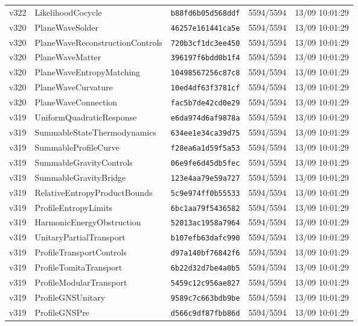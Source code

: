 \documentclass[11pt]{article}
\theoremstyle{definition}\newtheorem{deriv}{Derivation}
\begin{document}
{\begin{longtable}{@{}lllll@{}}
v322 & LikelihoodCocycle & \texttt{b88fd6b05d568ddf} & 5594/5594 & 13/09 10:01:29 \\
v320 & PlaneWaveSolder & \texttt{46257e161441ca5e} & 5594/5594 & 13/09 10:01:29 \\
v320 & PlaneWaveReconstructionControls & \texttt{720b3cf1dc3ee450} & 5594/5594 & 13/09 10:01:29 \\
v320 & PlaneWaveMatter & \texttt{396197f6bdd0b1f4} & 5594/5594 & 13/09 10:01:29 \\
v320 & PlaneWaveEntropyMatching & \texttt{10498567256c87c8} & 5594/5594 & 13/09 10:01:29 \\
v320 & PlaneWaveCurvature & \texttt{10ed4df63f3781cf} & 5594/5594 & 13/09 10:01:29 \\
v320 & PlaneWaveConnection & \texttt{fac5b7de42cd0e29} & 5594/5594 & 13/09 10:01:29 \\
v319 & UniformQuadraticResponse & \texttt{e6da974d6af9878a} & 5594/5594 & 13/09 10:01:29 \\
v319 & SummableStateThermodynamics & \texttt{634ee1e34ca39d75} & 5594/5594 & 13/09 10:01:29 \\
v319 & SummableProfileCurve & \texttt{f28ea6a1d59f5a53} & 5594/5594 & 13/09 10:01:29 \\
v319 & SummableGravityControls & \texttt{06e9fe6d45db5fec} & 5594/5594 & 13/09 10:01:29 \\
v319 & SummableGravityBridge & \texttt{123e4aa79e59a727} & 5594/5594 & 13/09 10:01:29 \\
v319 & RelativeEntropyProductBounds & \texttt{5c9e974ff0b55533} & 5594/5594 & 13/09 10:01:29 \\
v319 & ProfileEntropyLimits & \texttt{6bc1aa79f5436582} & 5594/5594 & 13/09 10:01:29 \\
v319 & HarmonicEnergyObstruction & \texttt{52013ac1958a7964} & 5594/5594 & 13/09 10:01:29 \\
v319 & UnitaryPartialTransport & \texttt{b107efb63dafc990} & 5594/5594 & 13/09 10:01:29 \\
v319 & ProfileTransportControls & \texttt{d97a140bf76842f6} & 5594/5594 & 13/09 10:01:29 \\
v319 & ProfileTomitaTransport & \texttt{6b22d32d7be4a0b5} & 5594/5594 & 13/09 10:01:29 \\
v319 & ProfileModularTransport & \texttt{5459c12c956ae827} & 5594/5594 & 13/09 10:01:29 \\
v319 & ProfileGNSUnitary & \texttt{9589c7c663bdb9be} & 5594/5594 & 13/09 10:01:29 \\
v319 & ProfileGNSPre & \texttt{d566c9df87fbb86d} & 5594/5594 & 13/09 10:01:29 \\

\end{longtable}}
\end{document}
